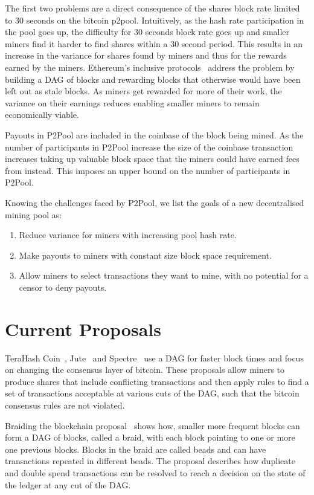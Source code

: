 \documentclass{article}
\begin{document}
The first two problems are a direct consequence of the shares block
rate limited to 30 seconds on the bitcoin p2pool. Intuitively, as the
hash rate participation in the pool goes up, the difficulty for 30
seconds block rate goes up and smaller miners find it harder to find
shares within a 30 second period. This results in an increase in the
variance for shares found by miners and thus for the rewards earned by
the miners. Ethereum's inclusive protocols~\cite{inclusive-protocols}
address the problem by building a DAG of blocks and rewarding blocks
that otherwise would have been left out as stale blocks. As miners get
rewarded for more of their work, the variance on their earnings
reduces enabling smaller miners to remain economically viable.

Payouts in P2Pool are included in the coinbase of the block being
mined. As the number of participants in P2Pool increase the size of
the coinbase transaction increases taking up valuable block space that
the miners could have earned fees from instead. This imposes an upper
bound on the number of participants in P2Pool.

Knowing the challenges faced by P2Pool, we list the goals of a new
decentralised mining pool as:

\begin{enumerate}
\item Reduce variance for miners with increasing pool hash rate.
\item Make payouts to miners with constant size block space
  requirement.
\item Allow miners to select transactions they want to mine, with no
  potential for a censor to deny payouts.
\end{enumerate}

\section{Current Proposals}

TeraHash Coin~\cite{mcelrath:variance}, Jute~\cite{jute} and
Spectre~\cite{spectre} use a DAG for faster block times and focus on
changing the consensus layer of bitcoin. These proposals allow miners
to produce shares that include conflicting transactions and then apply
rules to find a set of transactions acceptable at various cuts of the
DAG, such that the bitcoin consensus rules are not violated.

Braiding the blockchain proposal~\cite{mcelrath:variance} shows how,
smaller more frequent blocks can form a DAG of blocks, called a braid,
with each block pointing to one or more one previous blocks. Blocks in
the braid are called beads and can have transactions repeated in
different beads. The proposal describes how duplicate and double spend
transactions can be resolved to reach a decision on the state of the
ledger at any cut of the DAG.\@
\end{document}
